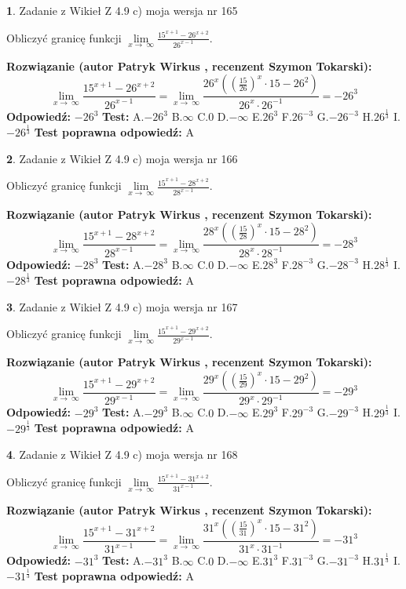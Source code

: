 \documentclass[12pt, a4paper]{article}
\theoremstyle{definition} %
\newtheorem{zad}{}
\newcommand{\zadStart}[1]{\begin{zad}#1\newline}
\newcommand{\zadStop}{\end{zad}}
\newcommand{\rozwStart}[2]{\noindent \textbf{Rozwiązanie (autor #1 , recenzent #2): }\newline}
\newcommand{\rozwStop}{\newline}
\newcommand{\odpStart}{\noindent \textbf{Odpowiedź:}\newline}
\newcommand{\odpStop}{\newline}
\newcommand{\testStart}{\noindent \textbf{Test:}\newline}
\newcommand{\testStop}{\newline}
\newcommand{\kluczStart}{\noindent \textbf{Test poprawna odpowiedź:}\newline}
\newcommand{\kluczStop}{\newline}
\begin{document}
\zadStart{Zadanie z Wikieł Z 4.9 c) moja wersja nr 165}


Obliczyć granicę funkcji  $\lim\limits_{x\to\ \infty}\frac{15^{x+1}-26^{x+2}}{26^{x-1}}$.
\zadStop
\rozwStart{Patryk Wirkus}{Szymon Tokarski}
$$\lim\limits_{x\to\ \infty}\frac{15^{x+1}-26^{x+2}}{26^{x-1}}=\lim\limits_{x\to\ \infty}\frac{26^{x}((\frac{15}{26})^{x}\cdot 15 -26^{2})}{26^{x}\cdot 26^{-1}} = -26^{3}$$
\rozwStop
\odpStart
$-26^{3}$
\odpStop
\testStart
A.$-26^{3}$ B.$\infty$ C.$0$ D.$-\infty$ E.$26^{3}$
F.$26^{-3}$ G.$-26^{-3}$
H.$26^{\frac{1}{3}}$
I.$-26^{\frac{1}{3}}$
\testStop
\kluczStart
A
\kluczStop



\zadStart{Zadanie z Wikieł Z 4.9 c) moja wersja nr 166}


Obliczyć granicę funkcji  $\lim\limits_{x\to\ \infty}\frac{15^{x+1}-28^{x+2}}{28^{x-1}}$.
\zadStop
\rozwStart{Patryk Wirkus}{Szymon Tokarski}
$$\lim\limits_{x\to\ \infty}\frac{15^{x+1}-28^{x+2}}{28^{x-1}}=\lim\limits_{x\to\ \infty}\frac{28^{x}((\frac{15}{28})^{x}\cdot 15 -28^{2})}{28^{x}\cdot 28^{-1}} = -28^{3}$$
\rozwStop
\odpStart
$-28^{3}$
\odpStop
\testStart
A.$-28^{3}$ B.$\infty$ C.$0$ D.$-\infty$ E.$28^{3}$
F.$28^{-3}$ G.$-28^{-3}$
H.$28^{\frac{1}{3}}$
I.$-28^{\frac{1}{3}}$
\testStop
\kluczStart
A
\kluczStop



\zadStart{Zadanie z Wikieł Z 4.9 c) moja wersja nr 167}


Obliczyć granicę funkcji  $\lim\limits_{x\to\ \infty}\frac{15^{x+1}-29^{x+2}}{29^{x-1}}$.
\zadStop
\rozwStart{Patryk Wirkus}{Szymon Tokarski}
$$\lim\limits_{x\to\ \infty}\frac{15^{x+1}-29^{x+2}}{29^{x-1}}=\lim\limits_{x\to\ \infty}\frac{29^{x}((\frac{15}{29})^{x}\cdot 15 -29^{2})}{29^{x}\cdot 29^{-1}} = -29^{3}$$
\rozwStop
\odpStart
$-29^{3}$
\odpStop
\testStart
A.$-29^{3}$ B.$\infty$ C.$0$ D.$-\infty$ E.$29^{3}$
F.$29^{-3}$ G.$-29^{-3}$
H.$29^{\frac{1}{3}}$
I.$-29^{\frac{1}{3}}$
\testStop
\kluczStart
A
\kluczStop



\zadStart{Zadanie z Wikieł Z 4.9 c) moja wersja nr 168}


Obliczyć granicę funkcji  $\lim\limits_{x\to\ \infty}\frac{15^{x+1}-31^{x+2}}{31^{x-1}}$.
\zadStop
\rozwStart{Patryk Wirkus}{Szymon Tokarski}
$$\lim\limits_{x\to\ \infty}\frac{15^{x+1}-31^{x+2}}{31^{x-1}}=\lim\limits_{x\to\ \infty}\frac{31^{x}((\frac{15}{31})^{x}\cdot 15 -31^{2})}{31^{x}\cdot 31^{-1}} = -31^{3}$$
\rozwStop
\odpStart
$-31^{3}$
\odpStop
\testStart
A.$-31^{3}$ B.$\infty$ C.$0$ D.$-\infty$ E.$31^{3}$
F.$31^{-3}$ G.$-31^{-3}$
H.$31^{\frac{1}{3}}$
I.$-31^{\frac{1}{3}}$
\testStop
\kluczStart
A
\kluczStop
\end{document}

